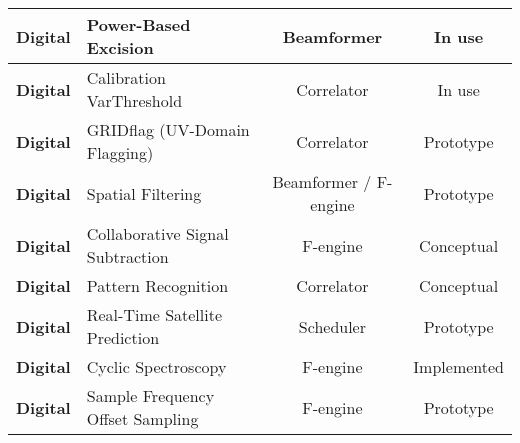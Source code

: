 \begin{table}
\begin{center}
{\begin{tabular}{|l|l|c|c|}
\textbf{Digital} & Power-Based Excision & Beamformer & In use \\ \hline
\textbf{Digital} & Calibration VarThreshold & Correlator & In use \\ \hline
\textbf{Digital} & GRIDflag (UV-Domain Flagging) & Correlator & Prototype \\ \hline
\textbf{Digital} & Spatial Filtering & Beamformer / F-engine & Prototype \\ \hline
\textbf{Digital} & Collaborative Signal Subtraction & F-engine & Conceptual \\ \hline
\textbf{Digital} & Pattern Recognition & Correlator & Conceptual \\ \hline
\textbf{Digital} & Real-Time Satellite Prediction & Scheduler & Prototype \\ \hline
\textbf{Digital} & Cyclic Spectroscopy & F-engine & Implemented \\ \hline
\textbf{Digital} & Sample Frequency Offset Sampling & F-engine & Prototype \\ \hline
\end{tabular}
  }
 \end{center}
\end{table}








